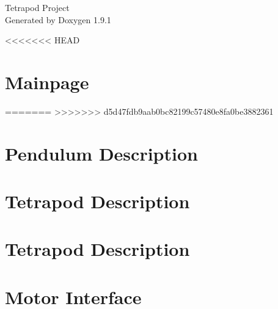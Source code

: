 \let\mypdfximage\pdfximage\def\pdfximage{\immediate\mypdfximage}\documentclass[twoside]{book}
\newcommand{\+}{\discretionary{\mbox{\scriptsize$\hookleftarrow$}}{}{}}
\newcommand{\clearemptydoublepage}{%
  \newpage{\pagestyle{empty}\cleardoublepage}%
}
\begin{document}
\raggedbottom

\hypersetup{pageanchor=false,
             bookmarksnumbered=true,
             pdfencoding=unicode
            }
\begin{titlepage}
\vspace*{7cm}
\begin{center}%
{\Large Tetrapod Project }\\
\vspace*{1cm}
{\large Generated by Doxygen 1.9.1}\\
\end{center}
\end{titlepage}
\clearemptydoublepage
{}
\tableofcontents
\clearemptydoublepage
{}
\hypersetup{pageanchor=true}

<<<<<<< HEAD
\chapter{Mainpage}
\label{index}\hypertarget{index}{}
=======
>>>>>>> d5d47fdb9aab0bc82199c57480e8fa0be3882361
\chapter{Pendulum Description}
\label{md_catkin_ws_src_simulator_pendulum_description_README}

\chapter{Tetrapod Description}
\label{md_catkin_ws_src_simulator_single_leg_description_README}

\chapter{Tetrapod Description}
\label{md_catkin_ws_src_simulator_tetrapod_description_README}

\chapter{Motor Interface}
\label{md_Arduino_libraries_motor_driver_README}

\end{document}
